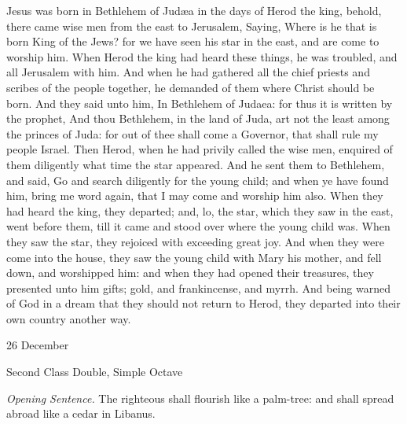  Jesus was born in Bethlehem of Jud{\ae}a in the days of Herod the king, behold, there came wise men from the east to Jerusalem, Saying, Where is he that is born King of the Jews? for we have seen his star in the east, and are come to worship him. When Herod the king had heard these things, he was troubled, and all Jerusalem with him. And when he had gathered all the chief priests and scribes of the people together, he demanded of them where Christ should be born. And they said unto him, In Bethlehem of Judaea: for thus it is written by the prophet, And thou Bethlehem, in the land of Juda, art not the least among the princes of Juda: for out of thee shall come a Governor, that shall rule my people Israel. Then Herod, when he had privily called the wise men, enquired of them diligently what time the star appeared. And he sent them to Bethlehem, and said, Go and search diligently for the young child; and when ye have found him, bring me word again, that I may come and worship him also. When they had heard the king, they departed; and, lo, the star, which they saw in the east, went before them, till it came and stood over where the young child was. When they saw the star, they rejoiced with exceeding great joy. And when they were come into the house, they saw the young child with Mary his mother, and fell down, and worshipped him: and when they had opened their treasures, they presented unto him gifts; gold, and frankincense, and myrrh. And being warned of God in a dream that they should not return to Herod, they departed into their own country another way.

\begin{inhead}
{26 December}\par
{Second Class Double, Simple Octave}
\end{inhead}
\par\noindent
\textit{Opening Sentence.} The righteous shall flourish like a palm-tree: and shall spread abroad like a cedar in Libanus.
 

